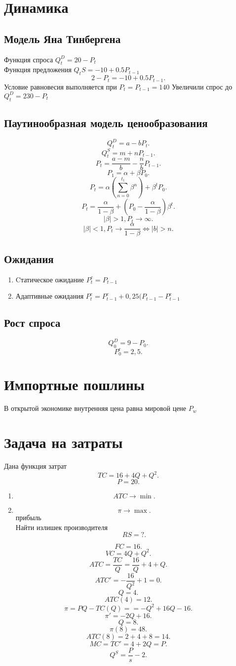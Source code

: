 \documentclass[14pt]{extarticle}
\begin{document}
\section{Динамика}
\subsection{Модель Яна Тинбергена}
Функция спроса $Q_{t}^{D} = 20 - P_{t}$ \\

Функция предложения $Q_{t}S = -10 + 0.5P_{t-1}$ 
\[
2- P_{t} = -10 + 0.5P_{t-1}
.\] 
Условие равновесия выполняется при $P_{t} = P_{t-1} = 140$ 
Увеличили спрос до $Q^{D}_{t} = 230 - P_{t}$
\subsection{Паутинообразная модель ценообразования}
\[
Q_{t}^{D} = a - b P_{t}
.\] 
\[
Q^{S}_{t} = m + n P_{t - 1}
.\] 
\[
P_{t}= \frac{a - m}{b} - \frac{n}{b} P_{t - 1}
.\] 
\[
P_1 = \alpha + \beta P_0
.\] 
\[
P_{t} = \alpha(\sum_{n=0}^{t_1} \beta^{n}) + \beta^{t} P_0
.\] 
\[
P_{t} = \frac{\alpha}{1 -\beta } + (P_0  - \frac{\alpha}{1 - \beta}) \beta^{t}
.\] 
\[
|\beta| > 1, P_{t} \to \infty
.\] 
\[
|\beta| < 1, P_{t} \to \frac{\alpha}{1-  \beta} \iff |b| > n
.\] 
\subsection{Ожидания}
\begin{enumerate}
    \item Cтатическое ожидание $P_{t}^{e} = P_{t -1}$
     \item Адаптивные ожидания $P_{t}^{e} = P^{e}_{t-1} + 0,25(P_{t-1} - P^{e}_{t-1}$
\end{enumerate}
\subsection{Рост спроса}
\[
Q_{0}^{D} = 9 - P_0
.\] 
\[
P_0^{e} = 2,5
.\] 
\section{Импортные пошлины}
В открытой экономике внутренняя цена равна мировой цене $P_{w}$
\section{Задача на затраты}
Дана функция затрат
\[
TC = 16 + 4Q + Q^2
.\] 
\[
P = 20
.\] 
\begin{enumerate}
    \item 
\[
ATC \to \min
.\] 
\item
\[
 \pi \to \max
.\] 
прибыль\\
Найти излишек производителя
\[
RS = ?
.\] 
\end{enumerate}
\[
FC = 16
.\] 
\[
VC = 4Q + Q^2
.\] 
\[
ATC = \frac{TC}{Q} = \frac{16}{Q} +  4 +  Q
.\] 
\[
ATC' =  -\frac{16}{Q^2} + 1 = 0
.\] 
\[
Q = 4
.\] 
\[
ATC(4) = 12
.\] 
\[
\pi =  PQ - TC(Q) = = -Q^2 +16Q - 16 
.\] 
\[
\pi' = -2Q + 16
.\] 
\[
Q = 8
.\] 
\[
\pi(8) = 48
.\] 
\[
ATC(8) = 2  + 4 + 8 = 14
.\] 
\[
MC = TC' = 4 + 2Q = P
.\] 
\[
Q^{S} = \frac{P}{s} - 2
.\] 
\end{document}
